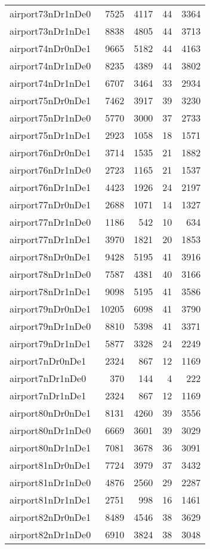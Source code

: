 \begin{longtable}{lrrrr}
airport73nDr1nDe0 & 7525 & 4117 & 44 & 3364 \\
airport73nDr1nDe1 & 8838 & 4805 & 44 & 3713 \\
airport74nDr0nDe1 & 9665 & 5182 & 44 & 4163 \\
airport74nDr1nDe0 & 8235 & 4389 & 44 & 3802 \\
airport74nDr1nDe1 & 6707 & 3464 & 33 & 2934 \\
airport75nDr0nDe1 & 7462 & 3917 & 39 & 3230 \\
airport75nDr1nDe0 & 5770 & 3000 & 37 & 2733 \\
airport75nDr1nDe1 & 2923 & 1058 & 18 & 1571 \\
airport76nDr0nDe1 & 3714 & 1535 & 21 & 1882 \\
airport76nDr1nDe0 & 2723 & 1165 & 21 & 1537 \\
airport76nDr1nDe1 & 4423 & 1926 & 24 & 2197 \\
airport77nDr0nDe1 & 2688 & 1071 & 14 & 1327 \\
airport77nDr1nDe0 & 1186 & 542 & 10 & 634 \\
airport77nDr1nDe1 & 3970 & 1821 & 20 & 1853 \\
airport78nDr0nDe1 & 9428 & 5195 & 41 & 3916 \\
airport78nDr1nDe0 & 7587 & 4381 & 40 & 3166 \\
airport78nDr1nDe1 & 9098 & 5195 & 41 & 3586 \\
airport79nDr0nDe1 & 10205 & 6098 & 41 & 3790 \\
airport79nDr1nDe0 & 8810 & 5398 & 41 & 3371 \\
airport79nDr1nDe1 & 5877 & 3328 & 24 & 2249 \\
airport7nDr0nDe1 & 2324 & 867 & 12 & 1169 \\
airport7nDr1nDe0 & 370 & 144 & 4 & 222 \\
airport7nDr1nDe1 & 2324 & 867 & 12 & 1169 \\
airport80nDr0nDe1 & 8131 & 4260 & 39 & 3556 \\
airport80nDr1nDe0 & 6669 & 3601 & 39 & 3029 \\
airport80nDr1nDe1 & 7081 & 3678 & 36 & 3091 \\
airport81nDr0nDe1 & 7724 & 3979 & 37 & 3432 \\
airport81nDr1nDe0 & 4876 & 2560 & 29 & 2287 \\
airport81nDr1nDe1 & 2751 & 998 & 16 & 1461 \\
airport82nDr0nDe1 & 8489 & 4546 & 38 & 3629 \\
airport82nDr1nDe0 & 6910 & 3824 & 38 & 3048 \\

\end{longtable}
